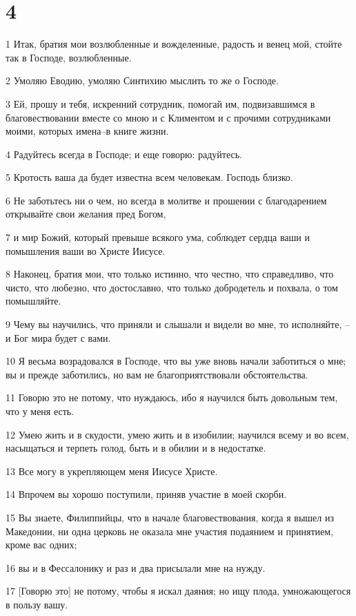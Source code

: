 \chapter{4}

\par 1 Итак, братия мои возлюбленные и вожделенные, радость и венец мой, стойте так в Господе, возлюбленные.
\par 2 Умоляю Еводию, умоляю Синтихию мыслить то же о Господе.
\par 3 Ей, прошу и тебя, искренний сотрудник, помогай им, подвизавшимся в благовествовании вместе со мною и с Климентом и с прочими сотрудниками моими, которых имена--в книге жизни.
\par 4 Радуйтесь всегда в Господе; и еще говорю: радуйтесь.
\par 5 Кротость ваша да будет известна всем человекам. Господь близко.
\par 6 Не заботьтесь ни о чем, но всегда в молитве и прошении с благодарением открывайте свои желания пред Богом,
\par 7 и мир Божий, который превыше всякого ума, соблюдет сердца ваши и помышления ваши во Христе Иисусе.
\par 8 Наконец, братия мои, что только истинно, что честно, что справедливо, что чисто, что любезно, что достославно, что только добродетель и похвала, о том помышляйте.
\par 9 Чему вы научились, что приняли и слышали и видели во мне, то исполняйте, --и Бог мира будет с вами.
\par 10 Я весьма возрадовался в Господе, что вы уже вновь начали заботиться о мне; вы и прежде заботились, но вам не благоприятствовали обстоятельства.
\par 11 Говорю это не потому, что нуждаюсь, ибо я научился быть довольным тем, что у меня есть.
\par 12 Умею жить и в скудости, умею жить и в изобилии; научился всему и во всем, насыщаться и терпеть голод, быть и в обилии и в недостатке.
\par 13 Все могу в укрепляющем меня Иисусе Христе.
\par 14 Впрочем вы хорошо поступили, приняв участие в моей скорби.
\par 15 Вы знаете, Филиппийцы, что в начале благовествования, когда я вышел из Македонии, ни одна церковь не оказала мне участия подаянием и принятием, кроме вас одних;
\par 16 вы и в Фессалонику и раз и два присылали мне на нужду.
\par 17 [Говорю это] не потому, чтобы я искал даяния; но ищу плода, умножающегося в пользу вашу.
